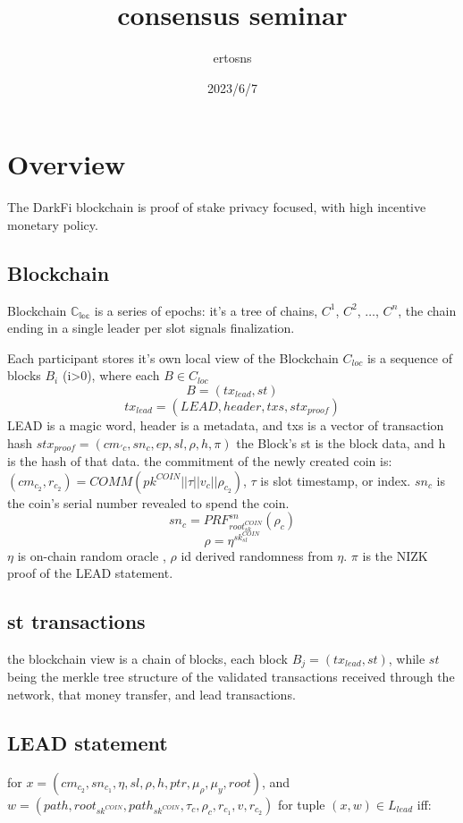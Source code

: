 \documentclass{article}
\begin{document}
\title {consensus seminar}
\author {ertosns}
\date {2023/6/7}
\maketitle

\section{ Overview}

The DarkFi blockchain is  proof of stake  privacy focused, with high incentive monetary policy.

\subsection{ Blockchain}

 Blockchain $\mathbb{C_{loc}}$ is a series of epochs: it's a tree of chains,
$C^1$, $C^2$, $\dots$, $C^n$, the chain ending in a single leader per slot signals finalization.


Each participant stores it's own local view of the Blockchain $C_{loc}$ is a sequence of blocks $B_i$ (i>0), where each $B \in C_{loc}$
$$ B = (tx_{lead},st)$$
$$tx_{lead} = (LEAD, header, txs, stx_{proof})$$
LEAD is a magic word, header is a metadata, and txs is a vector of transaction hash
$stx_{proof}=(cm_{\prime{c}},sn_c,ep,sl,\rho,h,\pi)$
the Block's st is the block data, and h is the hash of that data.
the commitment of the newly created coin is:
$(cm_{c_2},r_{c_2})=COMM(pk^{COIN}||\tau||v_c||\rho_{c_2})$,
$\tau$ is slot timestamp, or index. $sn_c$ is the coin's serial number revealed to spend the coin.
$$sn_c=PRF_{root_{sk}^{COIN}}^{sn}(\rho_c)$$
$$\rho=\eta^{sk_{sl}^{COIN}}$$
$\eta$ is on-chain random oracle , $\rho$ id derived randomness from $\eta$.  $\pi$ is the NIZK proof of the LEAD statement.


\subsection{ st transactions}
the blockchain view is a chain of blocks, each block $B_j=(tx_{lead},st)$, while $st$ being the merkle tree structure of the validated transactions received through the network, that money transfer, and lead transactions.

\subsection{ LEAD statement}
for $x=(cm_{c_2},sn_{c_1},\eta,sl,\rho,h,ptr,\mu_{\rho},\mu_{y},root)$, and
\newline
$w=(path,root_{sk^{COIN}},path_{sk^{COIN}},\tau_c,\rho_c,r_{c_1},v,r_{c_2})$
for tuple $(x,w) \in L_{lead}$ iff:
\end{document}
